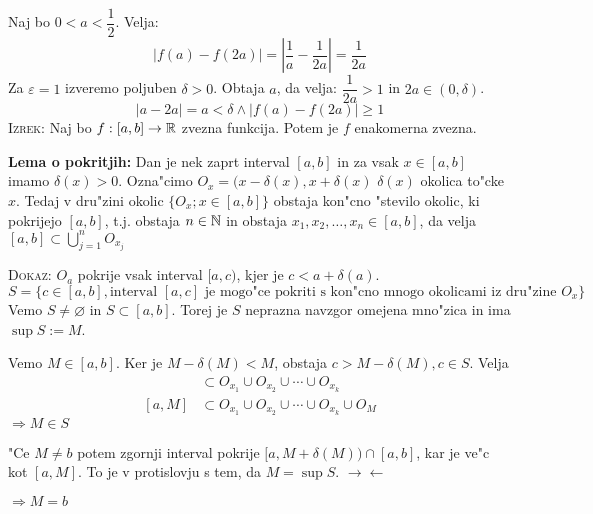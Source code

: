 Naj bo $0 < a < \dfrac{1}{2}$. Velja:
\begin{equation*}
|f(a) - f(2a)| = \left|\dfrac{1}{a} - \dfrac{1}{2a}\right| = \dfrac{1}{2a}
\end{equation*}
Za $\varepsilon = 1$ izveremo poljuben $\delta > 0$. Obtaja $a$, da velja: $\dfrac{1}{2a} > 1$ in $2a \in (0, \delta)$.
\begin{equation*}
|a - 2a| = a < \delta \land |f(a) - f(2a)| \geq 1
\end{equation*}
\textsc{Izrek:} Naj bo $f: [a, b] \to \mathbb{R}$ zvezna funkcija. Potem je $f$ enakomerna zvezna.

\textbf{Lema o pokritjih:} Dan je nek zaprt interval $[a, b]$ in za vsak $x \in [a, b]$ imamo $\delta(x) > 0$. Ozna"cimo $O_x = (x - \delta(x), x + \delta(x)$ $\delta(x)$ okolica to"cke $x$. Tedaj v dru"zini okolic $\{O_x; x \in [a, b]\}$ obstaja kon"cno "stevilo okolic, ki pokrijejo $[a, b]$, t.j. obstaja $n \in \mathbb{N}$ in obstaja $x_1, x_2, \ldots, x_n \in [a, b]$, da velja $[a, b] \subset \bigcup_{j=1}^n O_{x_j}$

\textsc{Dokaz:} $O_a$ pokrije vsak interval $[a, c)$, kjer je $c < a + \delta(a)$.
\begin{equation*}
S = \{c \in [a, b], \text{interval $[a, c]$ je mogo"ce pokriti s kon"cno mnogo okolicami iz dru"zine $O_x$}\}
\end{equation*}
Vemo $S \neq \varnothing$ in $S \subset [a, b]$. Torej je $S$ neprazna navzgor omejena mno"zica in ima $\sup S := M$.


Vemo $M \in [a, b]$. Ker je $M - \delta(M) < M$, obstaja $c > M - \delta(M), c \in S$. Velja
\begin{align*}
[a, c] & \subset O_{x_1} \cup O_{x_2} \cup \cdots \cup O_{x_k} \\
[a, M] & \subset O_{x_1} \cup O_{x_2} \cup \cdots \cup O_{x_k} \cup O_M
\end{align*}
$\Rightarrow M \in S$

"Ce $M \neq b$ potem zgornji interval pokrije $[a, M + \delta(M)) \cap [a, b]$, kar je ve"c kot $[a, M]$. To je v protislovju s tem, da $M = \sup S$. $\rightarrow \leftarrow$

$\Rightarrow M = b$